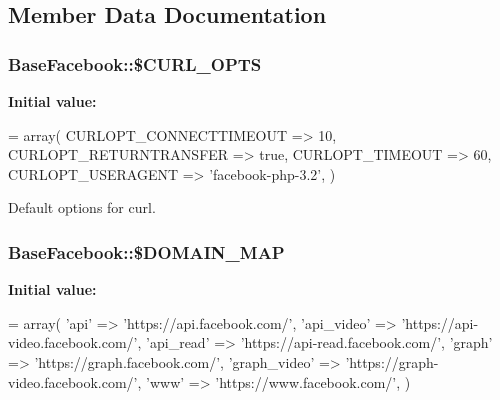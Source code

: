 \subsection{Member Data Documentation}
\hypertarget{classBaseFacebook_ad48ad58bc8120acf03f199bb100be6dd}{
\subsubsection[{\$\-C\-U\-R\-L\-\_\-\-O\-P\-T\-S}]{\setlength{\rightskip}{0pt plus 5cm}Base\-Facebook\-::\$\-C\-U\-R\-L\-\_\-\-O\-P\-T\-S\hspace{0.3cm}{\ttfamily [static]}}}\label{classBaseFacebook_ad48ad58bc8120acf03f199bb100be6dd}
{\bfseries Initial value\-:}
\begin{DoxyCode}
= array(
    CURLOPT\_CONNECTTIMEOUT => 10,
    CURLOPT\_RETURNTRANSFER => \textcolor{keyword}{true},
    CURLOPT\_TIMEOUT        => 60,
    CURLOPT\_USERAGENT      => \textcolor{stringliteral}{'facebook-php-3.2'},
  )
\end{DoxyCode}
Default options for curl. \hypertarget{classBaseFacebook_a154dee18518e85547854c5d51f77e314}{
\subsubsection[{\$\-D\-O\-M\-A\-I\-N\-\_\-\-M\-A\-P}]{\setlength{\rightskip}{0pt plus 5cm}Base\-Facebook\-::\$\-D\-O\-M\-A\-I\-N\-\_\-\-M\-A\-P\hspace{0.3cm}{\ttfamily [static]}}}\label{classBaseFacebook_a154dee18518e85547854c5d51f77e314}
{\bfseries Initial value\-:}
\begin{DoxyCode}
= array(
    \textcolor{stringliteral}{'api'}         => \textcolor{stringliteral}{'https://api.facebook.com/'},
    \textcolor{stringliteral}{'api\_video'}   => \textcolor{stringliteral}{'https://api-video.facebook.com/'},
    \textcolor{stringliteral}{'api\_read'}    => \textcolor{stringliteral}{'https://api-read.facebook.com/'},
    \textcolor{stringliteral}{'graph'}       => \textcolor{stringliteral}{'https://graph.facebook.com/'},
    \textcolor{stringliteral}{'graph\_video'} => \textcolor{stringliteral}{'https://graph-video.facebook.com/'},
    \textcolor{stringliteral}{'www'}         => \textcolor{stringliteral}{'https://www.facebook.com/'},
  )
\end{DoxyCode}
